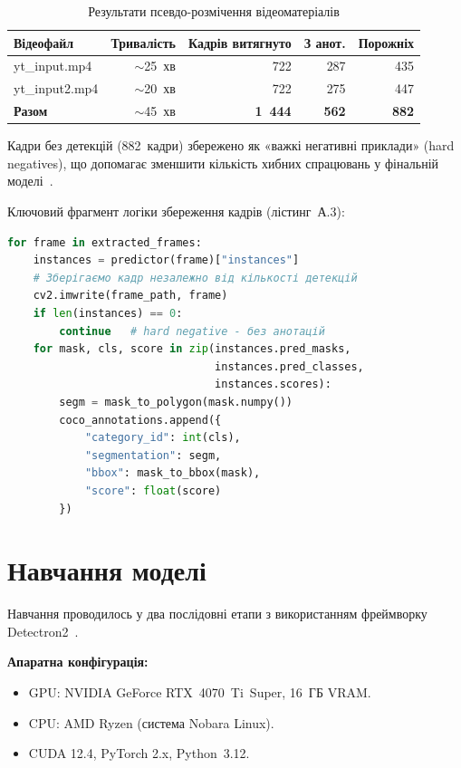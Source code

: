 \documentclass[14pt,a4paper]{extreport}
\begin{document}
\begin{table}[H]
\caption{Результати псевдо-розмічення відеоматеріалів}
\label{tab:pseudo}
\centering
\begin{tabular}{@{}lrrrr@{}}
\toprule
Відеофайл & Тривалість & Кадрів витягнуто & З анот. & Порожніх \\
\midrule
yt\_input.mp4  & $\sim$25~хв & 722 & 287 & 435 \\
yt\_input2.mp4 & $\sim$20~хв & 722 & 275 & 447 \\
\textbf{Разом} & $\sim$45~хв & \textbf{1~444} & \textbf{562} & \textbf{882} \\
\bottomrule
\end{tabular}
\end{table}

Кадри без детекцій (882~кадри) збережено як «важкі негативні приклади»
(hard negatives), що допомагає зменшити кількість хибних спрацювань у
фінальній моделі~\cite{liuUAVYOLO2020}.

Ключовий фрагмент логіки збереження кадрів (лістинг~А.3):

\begin{lstlisting}[language=Python, caption={}]
for frame in extracted_frames:
    instances = predictor(frame)["instances"]
    # Зберігаємо кадр незалежно від кількості детекцій
    cv2.imwrite(frame_path, frame)
    if len(instances) == 0:
        continue   # hard negative - без анотацій
    for mask, cls, score in zip(instances.pred_masks,
                                instances.pred_classes,
                                instances.scores):
        segm = mask_to_polygon(mask.numpy())
        coco_annotations.append({
            "category_id": int(cls),
            "segmentation": segm,
            "bbox": mask_to_bbox(mask),
            "score": float(score)
        })
\end{lstlisting}

\section{Навчання моделі}

Навчання проводилось у два послідовні етапи з використанням фреймворку
Detectron2~\cite{detectron2}.

\textbf{Апаратна конфігурація:}
\begin{itemize}
  \item GPU: NVIDIA GeForce RTX~4070~Ti~Super, 16~ГБ VRAM.
  \item CPU: AMD Ryzen (система Nobara Linux).
  \item CUDA 12.4, PyTorch 2.x, Python~3.12.
\end{itemize}
\end{document}
